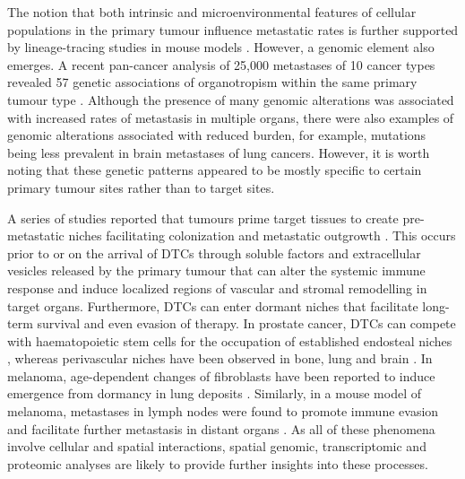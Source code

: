 The notion that both intrinsic and microenvironmental features of cellular populations in the primary tumour influence metastatic rates is further supported by lineage-tracing studies in mouse models \parencite{Quinn2021-lu}. However, a genomic element also emerges. A recent pan-cancer analysis of 25,000 metastases of 10 cancer types revealed 57 genetic associations of organotropism within the same primary tumour type \parencite{Nguyen2022-jr}. Although the presence of many genomic alterations was associated with increased rates of metastasis in multiple organs, there were also examples of genomic alterations associated with reduced burden, for example,  mutations being less prevalent in brain metastases of lung cancers. However, it is worth noting that these genetic patterns appeared to be mostly specific to certain primary tumour sites rather than to target sites.

A series of studies reported that tumours prime target tissues to create pre-metastatic niches facilitating colonization and metastatic outgrowth \parencite{Peinado2017-hz}. This occurs prior to or on the arrival of \acp{DTC} through soluble factors and extracellular vesicles released by the primary tumour that can alter the systemic immune response and induce localized regions of vascular and stromal remodelling in target organs. Furthermore, \acp{DTC} can enter dormant niches that facilitate long-term survival and even evasion of therapy. In prostate cancer, \acp{DTC} can compete with haematopoietic stem cells for the occupation of established endosteal niches \parencite{Shiozawa2011-cm}, whereas perivascular niches have been observed in bone, lung and brain \parencite{Kienast2010-ur,Ghajar2013-id}. In melanoma, age-dependent changes of fibroblasts have been reported to induce emergence from dormancy in lung deposits \parencite{Fane2022-sd}. Similarly, in a mouse model of melanoma, metastases in lymph nodes were found to promote immune evasion and facilitate further metastasis in distant organs \parencite{Reticker-Flynn2022-ho}. As all of these phenomena involve cellular and spatial interactions, spatial genomic, transcriptomic and proteomic analyses are likely to provide further insights into these processes.

